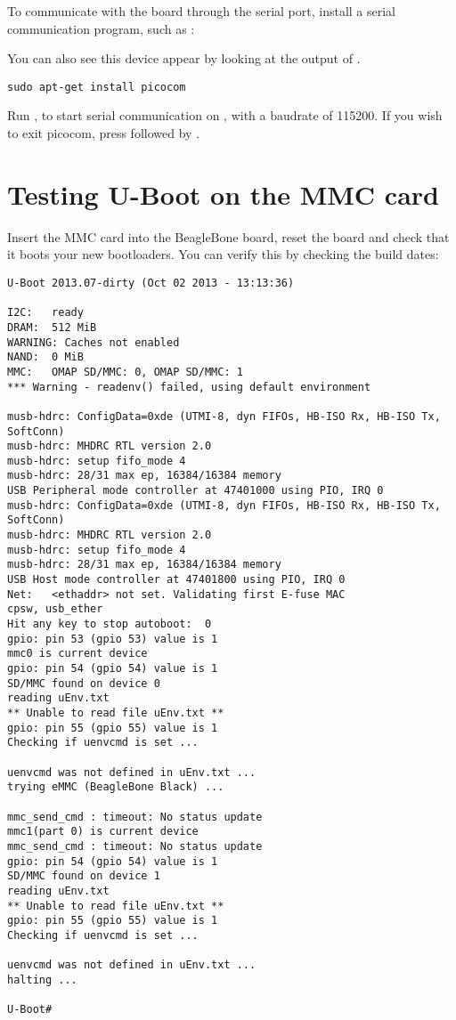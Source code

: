 To communicate with the board through the serial port, install a
serial communication program, such as :

You can also see this device appear by looking at the output of
.

\begin{verbatim}
sudo apt-get install picocom
\end{verbatim}

Run , to start serial
communication on , with a baudrate of 115200. If
you wish to exit picocom, press \code{[Ctrl][a]} followed by
\code{[Ctrl][x]}.

\section{Testing U-Boot on the MMC card}

Insert the MMC card into the BeagleBone board, reset the board and check
that it boots your new bootloaders. You can verify this by checking
the build dates:

\begin{verbatim}
U-Boot 2013.07-dirty (Oct 02 2013 - 13:13:36)

I2C:   ready
DRAM:  512 MiB
WARNING: Caches not enabled
NAND:  0 MiB
MMC:   OMAP SD/MMC: 0, OMAP SD/MMC: 1
*** Warning - readenv() failed, using default environment

musb-hdrc: ConfigData=0xde (UTMI-8, dyn FIFOs, HB-ISO Rx, HB-ISO Tx, SoftConn)
musb-hdrc: MHDRC RTL version 2.0
musb-hdrc: setup fifo_mode 4
musb-hdrc: 28/31 max ep, 16384/16384 memory
USB Peripheral mode controller at 47401000 using PIO, IRQ 0
musb-hdrc: ConfigData=0xde (UTMI-8, dyn FIFOs, HB-ISO Rx, HB-ISO Tx, SoftConn)
musb-hdrc: MHDRC RTL version 2.0
musb-hdrc: setup fifo_mode 4
musb-hdrc: 28/31 max ep, 16384/16384 memory
USB Host mode controller at 47401800 using PIO, IRQ 0
Net:   <ethaddr> not set. Validating first E-fuse MAC
cpsw, usb_ether
Hit any key to stop autoboot:  0
gpio: pin 53 (gpio 53) value is 1
mmc0 is current device
gpio: pin 54 (gpio 54) value is 1
SD/MMC found on device 0
reading uEnv.txt
** Unable to read file uEnv.txt **
gpio: pin 55 (gpio 55) value is 1
Checking if uenvcmd is set ...

uenvcmd was not defined in uEnv.txt ...
trying eMMC (BeagleBone Black) ...

mmc_send_cmd : timeout: No status update
mmc1(part 0) is current device
mmc_send_cmd : timeout: No status update
gpio: pin 54 (gpio 54) value is 1
SD/MMC found on device 1
reading uEnv.txt
** Unable to read file uEnv.txt **
gpio: pin 55 (gpio 55) value is 1
Checking if uenvcmd is set ...

uenvcmd was not defined in uEnv.txt ...
halting ...

U-Boot#
\end{verbatim}

